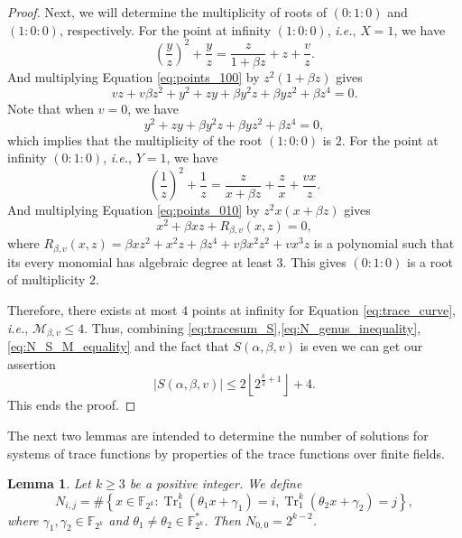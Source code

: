 \documentclass[preprint,10pt]{elsarticle}
\newcommand{\F}{\mathbb{F}}
\newcommand{\0}{\textbf{0}}
\newcommand{\1}{\textbf{1}}
\newcommand{\TRACE}{\operatorname{Tr}_1^k}
\theoremstyle{plain}
\newtheorem{lemma}{Lemma}
\begin{document}
\begin{proof}
        Next, we will determine the multiplicity of roots of $(0 : 1 : 0)$ and $(1 : 0 : 0)$, respectively.
        For the point at infinity $(1 : 0 : 0)$, \emph{i.e.}, $X = 1$, we have
        \begin{equation}\label{eq:points_100}
            \left( \frac{y}{z} \right)^2+\frac{y}{z}=\frac{z}{1+\beta z}+z+\frac{v}{z}.
        \end{equation}
        And multiplying Equation \eqref{eq:points_100} by $z^2(1+\beta z)$ gives
        \[vz+v\beta z^2+y^2+zy+\beta y^2z+\beta yz^2+\beta z^4=0.\]
        Note that when $v=0$, we have
        \[y^2+zy+\beta y^2z+\beta yz^2+\beta z^4=0,\]
        which implies that the multiplicity of the root $(1:0:0)$ is $2$.
        For the point at infinity $(0 : 1 : 0 )$, \emph{i.e.}, $Y = 1$, we have
        \begin{equation}\label{eq:points_010}
            \left( \frac{1}{z} \right)^2+\frac{1}{z}=\frac{z}{x+\beta z}+\frac{z}{x}+\frac{vx}{z}.
        \end{equation}
        And multiplying Equation \eqref{eq:points_010} by $z^2x(x+\beta z)$ gives
        \[x^2+\beta xz+R_{\beta,v}(x,z)=0,\]
        where $R_{\beta,v}(x,z)=\beta xz^2+x^2z+\beta z^4+v\beta x^2z^2+vx^3z$ is a polynomial
        such that its every monomial has algebraic degree at least $3$.
        This gives $(0 : 1 : 0)$ is a root of multiplicity $2$.

        Therefore, there exists at most $4$ points at infinity for Equation \eqref{eq:trace_curve}, \emph{i.e.},
        $\mathcal{M}_{\beta,v}\le 4$.
        Thus, combining \eqref{eq:tracesum_S},\eqref{eq:N_genus_inequality},\eqref{eq:N_S_M_equality} and the fact that
        $S(\alpha,\beta,v)$ is even we can get our assertion
        \[\left\lvert S(\alpha,\beta,v)\right\rvert \le 2\left\lfloor 2^{\frac{k}{2}+1}\right\rfloor+4.\]
        This ends the proof.
    \end{proof}
    The next two lemmas are intended to determine the number of solutions for systems of trace functions by properties of the trace functions over finite fields.
    \begin{lemma}\label{lemma:N_ij_trace}
        Let $k\ge 3$ be a positive integer.  We define
        \[ N_{i,j} =\#\left\{x\in\F_{2^k} : \TRACE\left(\theta_1x+\gamma_1\right)=i,\TRACE\left(\theta_2x+\gamma_2\right)=j\right\}, \]
        where  $\gamma_1,\gamma_2\in\F_{2^k}$ and $\theta_1\ne\theta_2\in\F_{2^k}^*$. Then $N_{0,0} =2^{k-2}$.
    \end{lemma}
\end{document}
